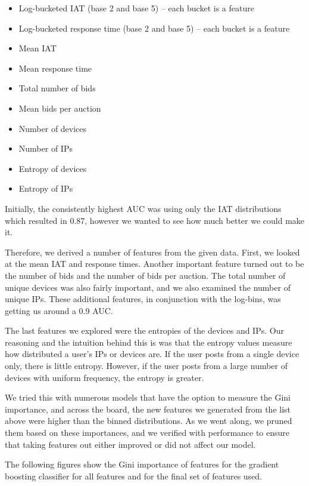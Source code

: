 \documentclass{article} %
\begin{document}
\begin{itemize}
\item Log-bucketed IAT (base 2 and base 5) -- each bucket is a feature
\item Log-bucketed response time (base 2 and base 5) -- each bucket is a feature
\item Mean IAT
\item Mean response time
\item Total number of bids
\item Mean bids per auction
\item Number of devices
\item Number of IPs
\item Entropy of devices
\item Entropy of IPs
\end{itemize}

Initially, the consistently highest AUC was using only the IAT distributions which resulted in 0.87, however we wanted to see how much better we could make it.

Therefore, we derived a number of features from the given data.
First, we looked at the mean IAT and response times.
Another important feature turned out to be the number of bids and the number of bids per auction.
The total number of unique devices was also fairly important, and we also examined the number of unique IPs.
These additional features, in conjunction with the log-bins, was getting us around a 0.9 AUC.

The last features we explored were the entropies of the devices and IPs.
Our reasoning and the intuition behind this is was that the entropy values measure how distributed a user's IPs or devices are.
If the user posts from a single device only, there is little entropy.
However, if the user posts from a large number of devices with uniform frequency, the entropy is greater.

We tried this with numerous models that have the option to measure the Gini importance, and across the board, the new features we generated from the list above were higher than the binned distributions.
As we went along, we pruned them based on these importances, and we verified with performance to ensure that taking features out either improved or did not affect our model.

The following figures show the Gini importance of features for the gradient boosting classifier for all features and for the final set of features used.
\end{document}
